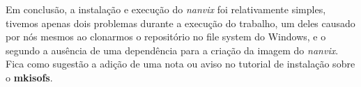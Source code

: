 \documentclass[12pt]{article}
\begin{document}
Em conclusão, a instalação e execução do \emph{nanvix} foi relativamente simples, tivemos apenas dois problemas durante a execução do trabalho, um deles causado por nós mesmos ao clonarmos o repositório no file system do Windows, e o segundo a ausência de uma dependência para a criação da imagem do \emph{nanvix}. Fica como sugestão a adição de uma nota ou aviso no tutorial de instalação sobre o \textbf{mkisofs}. 
\end{document}
